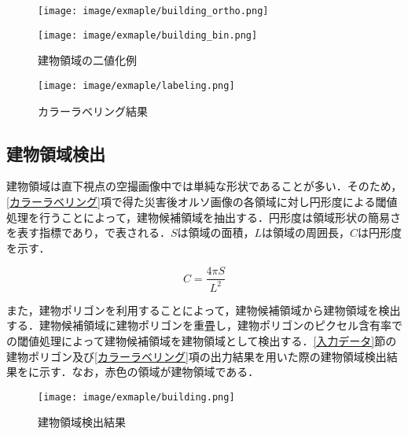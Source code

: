       \begin{figure}[tbp]
        \begin{minipage}[c]{0.5\hsize}
          \centering
          \texttt{[image: image/exmaple/building\_ortho.png]}
        \end{minipage}
        \begin{minipage}[c]{0.45\hsize}
          \centering
          \texttt{[image: image/exmaple/building\_bin.png]}
        \end{minipage}
        \caption{建物領域の二値化例}
        \label{建物領域の二値化例}
      \end{figure}

      \begin{figure}[tbp]
        \centering
        \texttt{[image: image/exmaple/labeling.png]}
        \caption{カラーラベリング結果}
        \label{カラーラベリング結果}
      \end{figure}


    \subsection{建物領域検出}
      \label{建物領域検出}
      建物領域は直下視点の空撮画像中では単純な形状であることが多い．そのため，\ref{カラーラベリング}項で得た災害後オルソ画像の各領域に対し円形度による閾値処理を行うことによって，建物候補領域を抽出する．円形度は領域形状の簡易さを表す指標であり，で表される．$S$は領域の面積，$L$は領域の周囲長，$C$は円形度を示す．

      \begin{equation}
        \label{円形度}
        C = \dfrac{4 \pi S} {L^2} 
      \end{equation}

      また，建物ポリゴンを利用することによって，建物候補領域から建物領域を検出する．建物候補領域に建物ポリゴンを重畳し，建物ポリゴンのピクセル含有率での閾値処理によって建物候補領域を建物領域として検出する．\ref{入力データ}節の建物ポリゴン及び\ref{カラーラベリング}項の出力結果を用いた際の建物領域検出結果をに示す．なお，赤色の領域が建物領域である．
      
      \begin{figure}[tbp]
        \centering
        \texttt{[image: image/exmaple/building.png]}
        \caption{建物領域検出結果}
        \label{建物領域検出結果}
      \end{figure}



